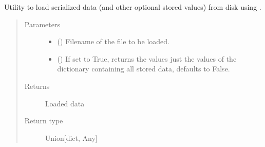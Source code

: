 \documentclass[letterpaper,10pt,english]{sphinxmanual}
\begin{document}
\begin{fulllineitems}
\label{\detokenize{code:utils.load_serialized_data}}
\sphinxAtStartPar
Utility to load serialized data (and other optional stored values)
from disk using .
\begin{quote}\begin{description}
\item[{Parameters}] \leavevmode\begin{itemize}
\item {} 
\sphinxAtStartPar
{} () \textendash{} Filename of the file to be loaded.

\item {} 
\sphinxAtStartPar
{} (\sphinxstyleliteralemphasis{\sphinxupquote{, }}) \textendash{} If set to True, returns the values just the values
of the dictionary containing all stored data, defaults to False.

\end{itemize}

\item[{Returns}] \leavevmode
\sphinxAtStartPar
Loaded data

\item[{Return type}] \leavevmode
\sphinxAtStartPar
Union{[}dict, Any{]}

\end{description}\end{quote}

\end{fulllineitems}

\end{document}
